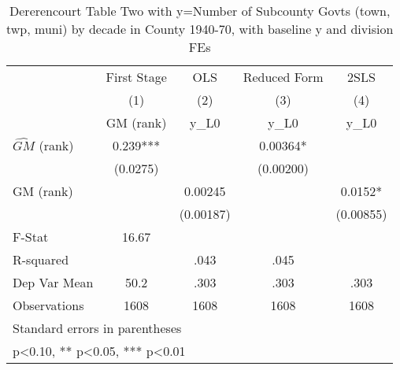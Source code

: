 \begin{table}[htbp]\centering
\def\sym#1{\ifmmode^{#1}\else\(^{#1}\)\fi}
\caption{Dererencourt Table Two with y=Number of Subcounty Govts (town, twp, muni) by decade in County 1940-70, with baseline y and division FEs}
\begin{tabular}{l*{4}{c}}
\toprule
                    & First Stage   &         OLS   &Reduced Form   &        2SLS   \\
                    &\multicolumn{1}{c}{(1)}&\multicolumn{1}{c}{(2)}&\multicolumn{1}{c}{(3)}&\multicolumn{1}{c}{(4)}\\
                    &\multicolumn{1}{c}{GM  (rank)}&\multicolumn{1}{c}{y\_L0}&\multicolumn{1}{c}{y\_L0}&\multicolumn{1}{c}{y\_L0}\\
\midrule
$\hat{GM}$ (rank)   &       0.239***&               &     0.00364*  &               \\
                    &    (0.0275)   &               &   (0.00200)   &               \\
\addlinespace
GM  (rank)          &               &     0.00245   &               &      0.0152*  \\
                    &               &   (0.00187)   &               &   (0.00855)   \\
\midrule
F-Stat              &       16.67   &               &               &               \\
R-squared           &               &        .043   &        .045   &               \\
Dep Var Mean        &        50.2   &        .303   &        .303   &        .303   \\
Observations        &        1608   &        1608   &        1608   &        1608   \\
\bottomrule
\multicolumn{5}{l}{\footnotesize Standard errors in parentheses}\\
\multicolumn{5}{l}{\footnotesize * p<0.10, ** p<0.05, *** p<0.01}\\
\end{tabular}
\end{table}
